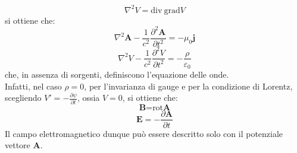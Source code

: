 \documentclass{article}
\begin{document}
\begin{equation}
\nabla^2V=\text{div}\ \text{grad}V
\nonumber
\end{equation}
si ottiene che:
\begin{equation}
\nabla^2\textbf{A}-\frac{1}{c^2}\frac{\partial^2\textbf{A}}{\partial t^2}=-\mu_0\textbf{j}
\nonumber
\end{equation}
\begin{equation}
\nabla^2V-\frac{1}{c^2}\frac{\partial^2V}{\partial t^2}=-\frac{\rho}{\varepsilon_0}
\nonumber
\end{equation}
che, in assenza di sorgenti, definiscono l’equazione delle onde.\\
Infatti, nel caso $\rho=0$, per l'invarianza di gauge e per la condizione di Lorentz, scegliendo $V'=-\frac{\partial \psi}{\partial t}$, ossia $V=0$, si ottiene che:
\begin{equation}
\textbf{B}=\text{rot}\textbf{A}
\nonumber
\end{equation}
\begin{equation}
\textbf{E}=-\frac{\partial \textbf{A}}{\partial t}
\nonumber
\end{equation}
Il campo elettromagnetico dunque può essere descritto solo con il potenziale vettore \textbf{A}.
\end{document}
